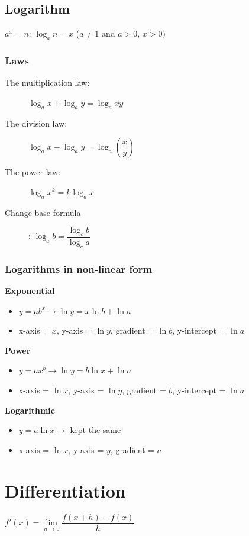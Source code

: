 \documentclass[A4paper]{article}
\begin{document}
	\subsection{Logarithm}
	$a^x = n$: $\log_a n = x$ ($a\neq1$ and $a>0$, $x>0$)
	\subsubsection{Laws}
	\begin{description}
		\item[The multiplication law:] $\log_a x + \log_a y = \log_a xy$
		\item[The division law:] $\log_a x - \log_a y = \log_a (\dfrac{x}{y})$
		\item[The power law:] $\log_a x^k = k\log_a x$
		\item[Change base formula]: $\log_a b = \dfrac{\log_c b}{\log_c a}$
	\end{description}

	\subsubsection{Logarithms in non-linear form}
	\textbf{Exponential}
	\begin{itemize}
		\item $y=ab^x\rightarrow\ln y = x\ln b + \ln a$
		\item x-axis = $x$, y-axis = $\ln y$, gradient = $\ln b$, y-intercept = $\ln a$
	\end{itemize}
	\textbf{Power}
	\begin{itemize}
		\item $y=ax^b\rightarrow\ln y = b\ln x + \ln a$
		\item x-axis = $\ln x$, y-axis = $\ln y$, gradient = $b$, y-intercept = $\ln a$
	\end{itemize}
	\textbf{Logarithmic}
	\begin{itemize}
		\item $y=a\ln x\rightarrow$ kept the same
		\item x-axis = $\ln x$, y-axis = $y$, gradient = $a$
	\end{itemize}

	\pagebreak

	\section{Differentiation}

	$f'(x) = \lim\limits_{n \to 0}\dfrac{f(x+h)-f(x)}{h}$
\end{document}
